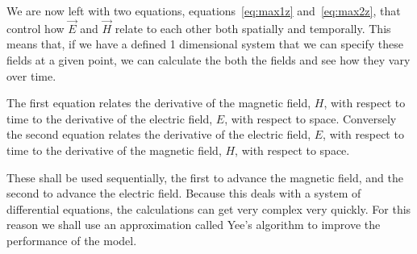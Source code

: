 We are now left with two equations, equations~\ref{eq:max1z} and~\ref{eq:max2z}, that control how $\vec{E}$ and $\vec{H}$ relate to each other both spatially and temporally. This means that, if we have a defined 1 dimensional system that we can specify these fields at a given point, we can calculate the both the fields and see how they vary over time. 

The first equation relates the derivative of the magnetic field, $H$, with respect to time to the derivative of the electric field, $E$, with respect to space. Conversely the second equation relates the derivative of the electric field, $E$, with respect to time to the derivative of the magnetic field, $H$, with respect to space.

These shall be used sequentially, the first to advance the magnetic field, and the second to advance the electric field. Because this deals with a system of differential equations, the calculations can get very complex very quickly. For this reason we shall use an approximation called Yee's algorithm to improve the performance of the model.
